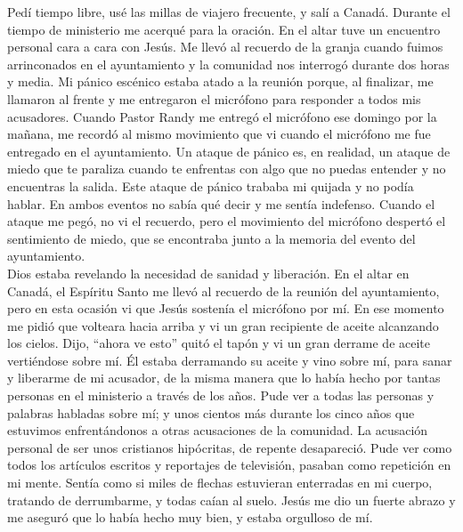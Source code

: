 \documentclass[twoside, 12pt]{book}
\begin{document}
Pedí tiempo libre, usé las millas de viajero frecuente, y salí a Canadá. Durante el tiempo de ministerio me acerqué para la oración. En el altar tuve un encuentro personal cara a cara con Jesús. Me llevó al recuerdo de la granja cuando fuimos arrinconados en el ayuntamiento y la comunidad nos interrogó durante dos horas y media. Mi pánico escénico estaba atado a la reunión porque, al finalizar, me llamaron al frente y me entregaron el micrófono para responder a todos mis acusadores. Cuando Pastor Randy me entregó el micrófono ese domingo por la mañana, me recordó al mismo movimiento que vi cuando el micrófono me fue entregado en el ayuntamiento. Un ataque de pánico es, en realidad, un ataque de miedo que te paraliza cuando te enfrentas con algo que no puedas entender y no encuentras la salida. Este ataque de pánico trababa mi quijada y no podía hablar. En ambos eventos no sabía qué decir y me sentía indefenso. Cuando el ataque me pegó, no vi el recuerdo, pero el movimiento del micrófono despertó el sentimiento de miedo, que se encontraba junto a la memoria del evento del ayuntamiento.\\
 
Dios estaba revelando la necesidad de sanidad y liberación. En el altar en Canadá, el Espíritu Santo me llevó al recuerdo de la reunión del ayuntamiento, pero en esta ocasión vi que Jesús sostenía el micrófono por mí. En ese momento me pidió que volteara hacia arriba y vi un gran recipiente de aceite alcanzando los cielos. Dijo, “ahora ve esto” quitó el tapón y vi un gran derrame de aceite vertiéndose sobre mí. Él estaba derramando su aceite y vino sobre mí, para sanar y liberarme de mi acusador, de la misma manera que lo había hecho por tantas personas en el ministerio a través de los años. Pude ver a todas las personas y palabras habladas sobre mí; y unos cientos más durante los cinco años que estuvimos enfrentándonos a otras acusaciones de la comunidad. La acusación personal de ser unos cristianos hipócritas, de repente desapareció. Pude ver como todos los artículos escritos y reportajes de televisión, pasaban como repetición en mi mente. Sentía como si miles de flechas estuvieran enterradas en mi cuerpo, tratando de derrumbarme, y todas caían al suelo. Jesús me dio un fuerte abrazo y me aseguró que lo había hecho muy bien, y estaba orgulloso de mí.\\
\end{document}
